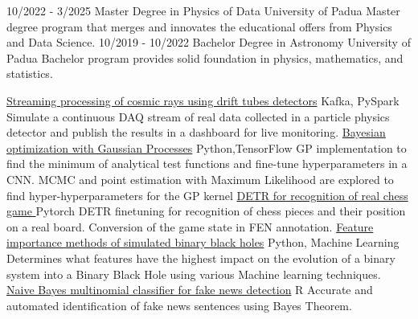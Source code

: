 \documentclass[9pt]{developercv} %
\begin{document}
\vspace{-10 pt}
\begin{entrylist}
    \entry
		{10/2022 - 3/2025}
		{Master Degree in Physics of Data }
		{University of Padua}
		{Master degree program that merges and innovates the educational offers from Physics and Data Science.}
    \entry
		{10/2019 - 10/2022}
		{Bachelor Degree in Astronomy}
		{University of Padua}
		{Bachelor program provides solid foundation in physics, mathematics, and statistics.}

\end{entrylist}


\begin{entrylist}
    \entry
		{}
		{\href{https://github.com/bhroben/Streaming-processing-of-cosmic-rays-using-drift-tubes-detectors}{Streaming processing of cosmic rays using drift tubes detectors}}
		{Kafka, PySpark}
		{
         Simulate a continuous DAQ stream of real data collected in a particle physics detector and publish the results in a dashboard for live monitoring.}
    \entry
		{}
		{\href{https://github.com/bhroben/Bayesian-Optimization-with-Gaussian-Process}{Bayesian optimization with Gaussian Processes}}
		{Python,TensorFlow}
		{%
       GP implementation to find the minimum of analytical test functions and fine-tune hyperparameters in a CNN. MCMC and point estimation with Maximum Likelihood are explored to find hyper-hyperparameters for the GP kernel}
    \entry
        {}
        {\href{https://github.com/bhroben/DETR-for-recognition-of-real-chess-game}{DETR for recognition of real chess game }}
        {Pytorch}
        {%
       DETR finetuning for recognition of chess pieces and their position on a real board. Conversion of the game state in FEN annotation.}
    \entry
		{}
		{\href{https://github.com/bhroben/Feature-importance-methods-of-simulated-binary-black-holes}{Feature importance methods of simulated binary black holes}}
		{Python, Machine Learning}
		{%
        Determines what features have the highest impact on the evolution of a binary system into a Binary Black Hole using various Machine learning  techniques.}
	\entry
		{}
		{\href{https://github.com/bhroben/Naive-Bayes-multinomial-classifier-for-fake-news-detection}{Naive Bayes multinomial classifier for fake news detection}}
		{R}
		{%
        Accurate and automated identification of fake news sentences using Bayes Theorem.}

\end{entrylist}
\end{document}
